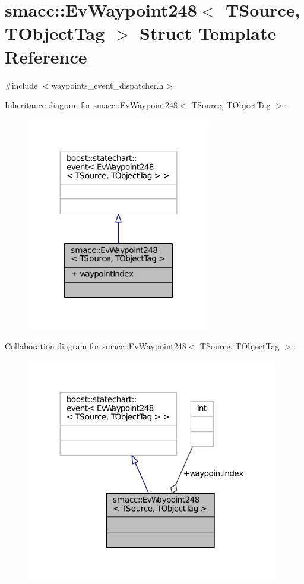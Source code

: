 \hypertarget{structsmacc_1_1EvWaypoint248}{}\section{smacc\+:\+:Ev\+Waypoint248$<$ T\+Source, T\+Object\+Tag $>$ Struct Template Reference}
\label{structsmacc_1_1EvWaypoint248}


{\ttfamily \#include $<$waypoints\+\_\+event\+\_\+dispatcher.\+h$>$}



Inheritance diagram for smacc\+:\+:Ev\+Waypoint248$<$ T\+Source, T\+Object\+Tag $>$\+:
\nopagebreak
\begin{figure}[H]
\begin{center}
\leavevmode
\includegraphics[width=227pt]{structsmacc_1_1EvWaypoint248__inherit__graph}
\end{center}
\end{figure}


Collaboration diagram for smacc\+:\+:Ev\+Waypoint248$<$ T\+Source, T\+Object\+Tag $>$\+:
\nopagebreak
\begin{figure}[H]
\begin{center}
\leavevmode
\includegraphics[width=312pt]{structsmacc_1_1EvWaypoint248__coll__graph}
\end{center}
\end{figure}
